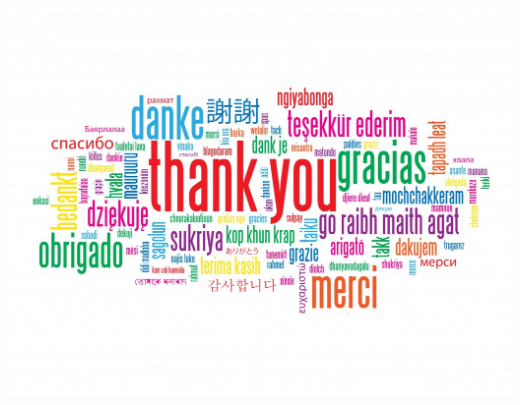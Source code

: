 \documentclass[14pt]{beamer}
\begin{document}
\begin{frame}

	\begin{center}

		\includegraphics[scale=0.3]{ty.jpg}

	\end{center}

\end{frame}
\end{document}
